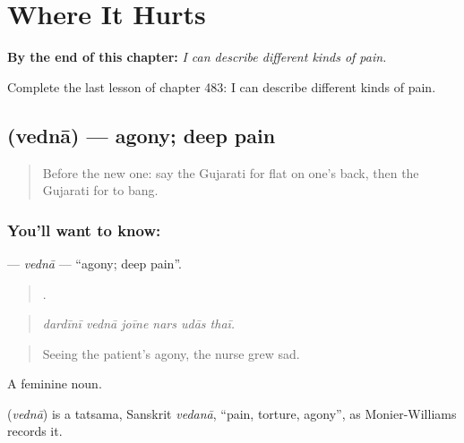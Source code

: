 
\chapter{Where It Hurts}
\label{ch:gu-where-it-hurts}

\begin{chapteropening}
\textbf{By the end of this chapter:} \emph{I can describe different kinds of pain.}

Complete the last lesson of chapter 483: I can describe different kinds of pain.
\end{chapteropening}

\section[\texorpdfstring{\gu{વેદના} (vednā)}{વેદના (vednā)}]{ (vednā) — agony; deep pain}

\label{lesson:GU-C483-vedna}



\begin{quote}
Before the new one: say the Gujarati for flat on one's back, then the Gujarati for to bang.
\end{quote}

\subsection*{You'll want to know: }
\textbf{} — \emph{vednā} — \textquotedblleft{}agony; deep pain\textquotedblright{}.

\begin{quote}
     .
\end{quote}

\begin{quote}
\emph{dardīnī vednā joīne nars udās thaī.}
\end{quote}

\begin{quote}
Seeing the patient's agony, the nurse grew sad.
\end{quote}

A feminine noun.

\begin{cousinweb}
\textbf{} (\emph{vednā}) is a tatsama, Sanskrit \emph{vedanā}, \textquotedblleft{}pain, torture, agony\textquotedblright{}, as Monier-Williams records it.
\end{cousinweb}

